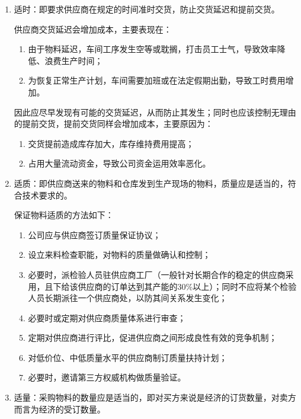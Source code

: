    \begin{enumerate}
    \item  适时：即要求供应商在规定的时间准时交货，防止交货延迟和提前交货。

    供应商交货延迟会增加成本，主要表现在：
        \begin{enumerate}
            \item  由于物料延迟，车间工序发生空等或耽搁，打击员工士气，导致效率降低、浪费生产时间；
            \item  为恢复正常生产计划，车间需要加班或在法定假期出勤，导致工时费用增加。
        \end{enumerate}

    因此应尽早发现有可能的交货延迟，从而防止其发生；同时也应该控制无理由的提前交货，提前交货同样会增加成本，主要原因为：
        \begin{enumerate}
            \item  交货提前造成库存加大，库存维持费用提高；
            \item  占用大量流动资金，导致公司资金运用效率恶化。
        \end{enumerate}

    \item  适质：即供应商送来的物料和仓库发到生产现场的物料，质量应是适当的，符合技术要求的。

    保证物料适质的方法如下：
        \begin{enumerate}
            \item  公司应与供应商签订质量保证协议；
            \item  设立来料检查职能，对物料的质量做确认和控制；
            \item  必要时，派检验人员驻供应商工厂（一般针对长期合作的稳定的供应商采用，且下给该供应商的订单达到其产能的30\%以上）；同时不应将某个检验人员长期派往一个供应商处，以防其间关系发生变化；
            \item  必要时或定期对供应商质量体系进行审查；
            \item  定期对供应商进行评比，促进供应商之间形成良性有效的竞争机制；
            \item  对低价位、中低质量水平的供应商制订质量扶持计划；
            \item  必要时，邀请第三方权威机构做质量验证。
        \end{enumerate}

    \item  适量：采购物料的数量应是适当的，即对买方来说是经济的订货数量，对卖方而言为经济的受订数量。


\end{enumerate}
